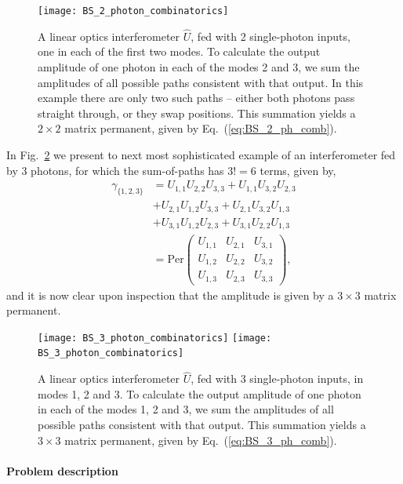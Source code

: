 \begin{figure}[!htbp]
\texttt{[image: BS\_2\_photon\_combinatorics]}
\captionspacefig \caption{A linear optics interferometer $\hat{U}$, fed with 2 single-photon inputs, one in each of the first two modes. To calculate the output amplitude of one photon in each of the modes 2 and 3, we sum the amplitudes of all possible paths consistent with that output. In this example there are only two such paths -- either both photons pass straight through, or they swap positions. This summation yields a \mbox{$2\times 2$} matrix permanent, given by Eq.~(\ref{eq:BS_2_ph_comb}).}\label{fig:BS_2_comb}	
\end{figure}

In Fig.~\ref{fig:BS_3_comb} we present to next most sophisticated example of an interferometer fed by 3 photons, for which the sum-of-paths has \mbox{$3!=6$} terms, given by,
\begin{align} \label{eq:BS_3_ph_comb}
\gamma_{\{1,2,3\}} &= U_{1,1}U_{2,2}U_{3,3} + U_{1,1}U_{3,2}U_{2,3} \nonumber \\
&+ U_{2,1}U_{1,2}U_{3,3} + U_{2,1}U_{3,2}U_{1,3} \nonumber \\
&+ U_{3,1}U_{1,2}U_{2,3} + U_{3,1}U_{2,2}U_{1,3}
\nonumber \\
&= \mathrm{Per} \begin{pmatrix}
   U_{1,1} & U_{2,1} & U_{3,1} \\
   U_{1,2} & U_{2,2} & U_{3,2} \\
   U_{1,3} & U_{2,3} & U_{3,3}
  \end{pmatrix},
\end{align}
and it is now clear upon inspection that the amplitude is given by a \mbox{$3\times 3$} matrix permanent.

\begin{figure}[!htbp]
\pubmode
	\texttt{[image: BS\_3\_photon\_combinatorics]}
\else
	\texttt{[image: BS\_3\_photon\_combinatorics]}
\fi
\captionspacefig \caption{A linear optics interferometer $\hat{U}$, fed with 3 single-photon inputs, in modes 1, 2 and 3. To calculate the output amplitude of one photon in each of the modes 1, 2 and 3, we sum the amplitudes of all possible paths consistent with that output. This summation yields a \mbox{$3\times 3$} matrix permanent, given by Eq.~(\ref{eq:BS_3_ph_comb}).}\label{fig:BS_3_comb}	
\end{figure}

\paragraph{Problem description}

